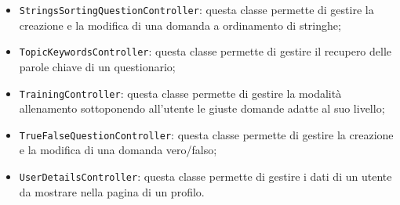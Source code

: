 \begin{itemize}
\begin{itemize}
		\item \texttt{StringsSortingQuestionController}: questa classe permette di gestire la creazione e la modifica di una domanda a ordinamento di stringhe;
		\item \texttt{TopicKeywordsController}: questa classe permette di gestire il recupero delle parole chiave di un questionario;
		\item \texttt{TrainingController}: questa classe permette di gestire la modalità allenamento sottoponendo all'utente le giuste domande adatte al suo livello;
		\item \texttt{TrueFalseQuestionController}: questa classe permette di gestire la creazione e la modifica di una domanda	vero/falso;
		\item \texttt{UserDetailsController}: questa classe permette di gestire i dati di un utente da mostrare nella pagina di un profilo.
	\end{itemize} 
\end{itemize}